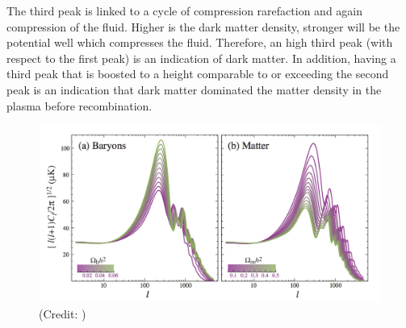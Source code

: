 \documentclass{article}
\begin{document}
The third peak is linked to a cycle of compression rarefaction and again compression of the fluid.
Higher is the dark matter density, stronger will be the potential well which compresses the fluid.
Therefore, an high third peak (with respect to the first peak) is an indication of dark matter.
In addition, having a third peak that is boosted to a height comparable to or exceeding the second peak is an indication that dark matter dominated the matter density in the plasma before recombination.




\par 


%








\begin{figure}[h]
\begin{center}
\includegraphics[width=\textwidth]{baryon_m}
\end{center}
\caption{(Credit: \cite{huCosmicMicrowaveBackground2001})}
\label{DM_bary}
\end{figure}
\end{document}
